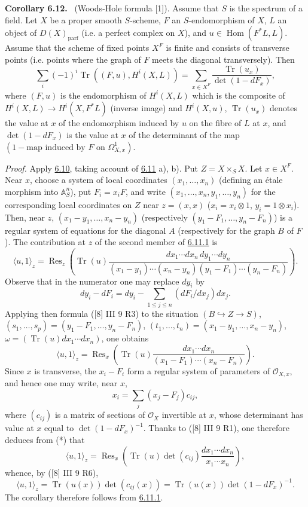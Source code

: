 \documentclass[11pt]{article}
\newenvironment{statement}[1]{\par\medskip\noindent\textbf{#1.}\ }{\par\medskip}
\DeclareMathOperator{\Hom}{Hom}
\providecommand{\OO}{\mathcal{O}}
\providecommand{\parf}{\mathrm{parf}}
\providecommand{\Hom}{\operatorname{Hom}}
\providecommand{\parf}{\mathrm{parf}}
\providecommand{\Hom}{\operatorname{Hom}}
\begin{document}
\label{sga5:III:corollary:6.12}\begin{statement}{Corollary 6.12}
(Woods-Hole formula [1]). Assume that $S$ is the spectrum of a field. Let $X$ be a proper smooth $S$-scheme, $F$ an $S$-endomorphism of $X$, $L$ an object of $D(X)_{\parf}$ (i.e. a perfect complex on $X$), and $u\in\Hom(F^*L,L)$. Assume that the scheme of fixed points $X^F$ is finite and consists of transverse points (i.e. points where the graph of $F$ meets the diagonal transversely). Then
\[
\sum_i(-1)^i\operatorname{Tr}((F,u),H^i(X,L))=
\sum_{x\in X^F}\frac{\operatorname{Tr}(u_x)}{\det(1-dF_x)},
\]
where $(F,u)$ is the endomorphism of $H^i(X,L)$ which is the composite of $H^i(X,L)\to H^i(X,F^*L)$ (inverse image) and $H^i(X,u)$, $\operatorname{Tr}(u_x)$ denotes the value at $x$ of the endomorphism induced by $u$ on the fibre of $L$ at $x$, and $\det(1-dF_x)$ is the value at $x$ of the determinant of the map $(1-\text{map induced by }F\text{ on }\Omega^1_{X,x})$.

\emph{Proof.} Apply \hyperref[sga5:III:theorem:6.10]{6.10}, taking account of \hyperref[sga5:III:remark:6.11]{6.11} a), b). Put $Z=X\times_S X$. Let $x\in X^F$. Near $x$, choose a system of local coordinates $(x_1,\ldots,x_n)$ (defining an étale morphism into $\mathbb A_S^n$), put $F_i=x_iF$, and write $(x_1,\ldots,x_n,y_1,\ldots,y_n)$ for the corresponding local coordinates on $Z$ near $z=(x,x)$ ($x_i=x_i\otimes1$, $y_i=1\otimes x_i$). Then, near $z$, $(x_1-y_1,\ldots,x_n-y_n)$ (respectively $(y_1-F_1,\ldots,y_n-F_n)$) is a regular system of equations for the diagonal $A$ (respectively for the graph $B$ of $F$). The contribution at $z$ of the second member of \hyperref[sga5:III:equation:6.11.1]{6.11.1} is
\[
\langle u,1\rangle_z=
\operatorname{Res}_z\left(\operatorname{Tr}(u)\frac{dx_1\cdots dx_n\,dy_1\cdots dy_n}{(x_1-y_1)\cdots(x_n-y_n)(y_1-F_1)\cdots(y_n-F_n)}\right).
\]
Observe that in the numerator one may replace $dy_i$ by
\[
dy_i-dF_i=dy_i-\sum_{1\le j\le n}(dF_i/dx_j)dx_j.
\]
Applying then formula ([8] III 9 R3) to the situation $(B\hookrightarrow Z\to S)$, $(s_1,\ldots,s_p)=(y_1-F_1,\ldots,y_n-F_n)$, $(t_1,\ldots,t_n)=(x_1-y_1,\ldots,x_n-y_n)$, $\omega=(\operatorname{Tr}(u)dx_1\cdots dx_n)$, one obtains
\begin{equation}
\tag{*}\label{sga5:III:equation:unnumbered:2}
\langle u,1\rangle_z=
\operatorname{Res}_x\left(\operatorname{Tr}(u)\frac{dx_1\cdots dx_n}{(x_1-F_1)\cdots(x_n-F_n)}\right).
\end{equation}
Since $x$ is transverse, the $x_i-F_i$ form a regular system of parameters of $\OO_{X,x}$, and hence one may write, near $x$,
\[
x_i=\sum_j(x_j-F_j)c_{ij},
\]
where $(c_{ij})$ is a matrix of sections of $\OO_X$ invertible at $x$, whose determinant has value at $x$ equal to $\det(1-dF_x)^{-1}$. Thanks to ([8] III 9 R1), one therefore deduces from (*) that
\[
\langle u,1\rangle_z=\operatorname{Res}_x\left(\operatorname{Tr}(u)\det(c_{ij})\frac{dx_1\cdots dx_n}{x_1\cdots x_n}\right),
\]
whence, by ([8] III 9 R6),
\[
\langle u,1\rangle_z=\operatorname{Tr}(u(x))\det(c_{ij}(x))=\operatorname{Tr}(u(x))\det(1-dF_x)^{-1}.
\]
The corollary therefore follows from \hyperref[sga5:III:equation:6.11.1]{6.11.1}.
\end{statement}
\end{document}
